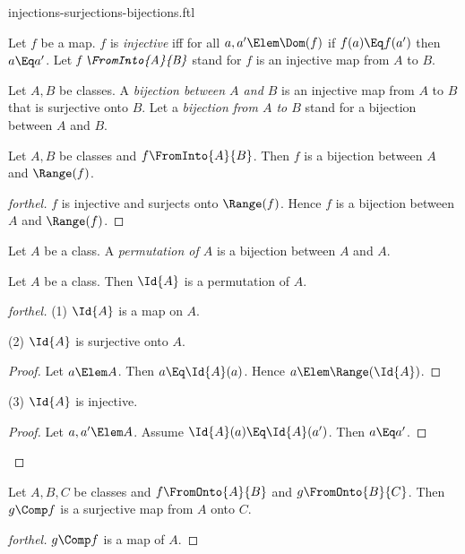 \documentclass{stex}
\begin{document}
\begin{smodule}{injections-surjections-bijections.ftl}
\begin{definition*}[forthel,for={injective,FromInto}]
  Let $f$ be a map.
  $f$ is \emph{injective} iff for all $a, a' \Elem \Dom(f)$ if $f(a) \Eq f(a')$ then $a \Eq a'$.
  Let $\emph{f \FromInto{A}{B}}$ stand for $f$ is an injective map from $A$ to $B$.
\end{definition*}

\begin{definition*}[forthel,for=bijection]
  Let $A, B$ be classes.
  A \emph{bijection between $A$ and $B$} is an injective map from $A$ to $B$ that is surjective onto $B$.
  Let a \emph{bijection from $A$ to $B$} stand for a bijection between $A$ and $B$.
\end{definition*}

\begin{proposition*}[forthel]
  Let $A, B$ be classes and $f \FromInto{A}{B}$.
  Then $f$ is a bijection between $A$ and $\Range(f)$.
\end{proposition*}
\begin{proof}[forthel]
  $f$ is injective and surjects onto $\Range(f)$.
  Hence $f$ is a bijection between $A$ and $\Range(f)$.
\end{proof}

\begin{definition*}[forthel,for=permutation]
  Let $A$ be a class.
  A \emph{permutation of $A$} is a bijection between $A$ and $A$.
\end{definition*}

\begin{proposition*}[forthel]
  Let $A$ be a class.
  Then $\Id{A}$ is a permutation of $A$.
\end{proposition*}
\begin{proof}[forthel]
  (1) $\Id{A}$ is a map on $A$.

  (2) $\Id{A}$ is surjective onto $A$.
  \begin{proof}
    Let $a \Elem A$.
    Then $a \Eq \Id{A}(a)$.
    Hence $a \Elem \Range(\Id{A})$.
  \end{proof}

  (3) $\Id{A}$ is injective.
  \begin{proof}
    Let $a, a' \Elem A$.
    Assume $\Id{A}(a) \Eq \Id{A}(a')$.
    Then $a \Eq a'$.
  \end{proof}
\end{proof}

\begin{proposition*}[forthel,name=surjectivity of composition of surjections]
  Let $A, B, C$ be classes and $f \FromOnto{A}{B}$ and $g \FromOnto{B}{C}$.
  Then $g \Comp f$ is a surjective map from $A$ onto $C$.
\end{proposition*}
\begin{proof}[forthel]
  $g \Comp f$ is a map of $A$.


\end{proof}
\end{smodule}
\end{document}
